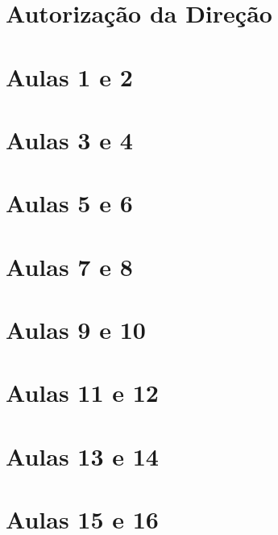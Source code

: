 

\begin{apendicesenv}

    \partapendices
    \chapter{Autorização da Direção} \label{ApendiceA} 
    \chapter{Aulas 1 e 2} \label{ApendiceB} 
    \chapter{Aulas 3 e 4} \label{ApendiceC} 
    \chapter{Aulas 5 e 6} \label{ApendiceD} 
    \chapter{Aulas 7 e 8} \label{ApendiceE} 
    \chapter{Aulas 9 e 10} \label{ApendiceF} 
    \chapter{Aulas 11 e 12} \label{ApendiceG} 
    \chapter{Aulas 13 e 14} \label{ApendiceH} 
    \chapter{Aulas 15 e 16} \label{ApendiceI} 

\end{apendicesenv}
